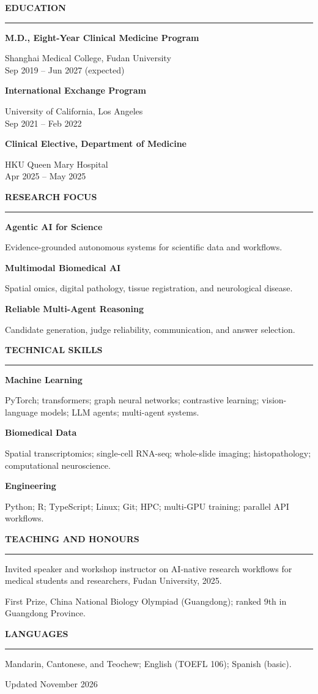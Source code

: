 \documentclass[10pt,a4paper]{article}
\newcommand{\sideheading}[1]{%
  \vspace{0.45em}%
  {\fontsize{9.2}{10}\selectfont\bfseries\color{Navy}\MakeUppercase{#1}}\par
  \vspace{0.12em}\color{Teal}\rule{\linewidth}{0.7pt}\color{Ink}\vspace{0.25em}
}
\newcommand{\bodytext}[1]{{\fontsize{8.35}{9.8}\selectfont\RaggedRight #1}}
\newcommand{\sidebaritem}[2]{%
  {\fontsize{8.15}{9.35}\selectfont\bfseries\color{Ink}\RaggedRight #1}\par
  {\fontsize{7.8}{9.1}\selectfont\color{Muted}\RaggedRight #2}\par\vspace{0.31em}
}
\newcommand{\skillline}[2]{%
  {\fontsize{7.85}{9.2}\selectfont\bfseries\color{Navy}\RaggedRight #1}\par
  {\fontsize{7.65}{9.05}\selectfont\color{Ink}\RaggedRight #2}\par\vspace{0.28em}
}
\begin{document}
\begin{minipage}[t]{0.295\textwidth}
\vspace{0pt}\RaggedRight

\sideheading{Education}
\sidebaritem{M.D., Eight-Year Clinical Medicine Program}{Shanghai Medical College, Fudan University\\Sep 2019 -- Jun 2027 (expected)}
\sidebaritem{International Exchange Program}{University of California, Los Angeles\\Sep 2021 -- Feb 2022}
\sidebaritem{Clinical Elective, Department of Medicine}{HKU Queen Mary Hospital\\Apr 2025 -- May 2025}

\sideheading{Research Focus}
\skillline{Agentic AI for Science}{Evidence-grounded autonomous systems for scientific data and workflows.}
\skillline{Multimodal Biomedical AI}{Spatial omics, digital pathology, tissue registration, and neurological disease.}
\skillline{Reliable Multi-Agent Reasoning}{Candidate generation, judge reliability, communication, and answer selection.}

\sideheading{Technical Skills}
\skillline{Machine Learning}{PyTorch; transformers; graph neural networks; contrastive learning; vision-language models; LLM agents; multi-agent systems.}
\skillline{Biomedical Data}{Spatial transcriptomics; single-cell RNA-seq; whole-slide imaging; histopathology; computational neuroscience.}
\skillline{Engineering}{Python; R; TypeScript; Linux; Git; HPC; multi-GPU training; parallel API workflows.}

\sideheading{Teaching and Honours}
\bodytext{Invited speaker and workshop instructor on AI-native research workflows for medical students and researchers, Fudan University, 2025.}\par
\vspace{0.34em}
\bodytext{First Prize, China National Biology Olympiad (Guangdong); ranked 9th in Guangdong Province.}\par

\sideheading{Languages}
\bodytext{Mandarin, Cantonese, and Teochew; English (TOEFL 106); Spanish (basic).}

\vfill
{\fontsize{7.2}{8.3}\selectfont\color{Muted}Updated November 2026}

\end{minipage}
\end{document}
